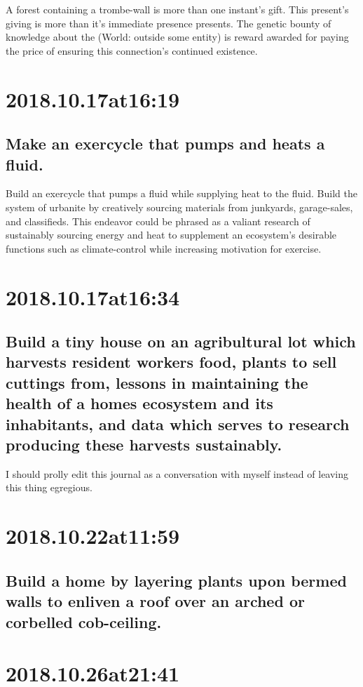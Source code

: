 A forest containing a trombe-wall is more than one instant's gift.
This present's giving is more than it's immediate presence presents.
The genetic bounty of knowledge about the (World: outside some entity) is reward awarded for paying the price of ensuring this connection's continued existence.

\section*{ 2018.10.17at16:19 }
\subsection*{ Make an exercycle that pumps and heats a fluid. }
Build an exercycle that pumps a fluid while supplying heat to the fluid. Build the system of urbanite by creatively sourcing materials from junkyards, garage-sales, and classifieds. This endeavor could be phrased as a valiant research of sustainably sourcing energy and heat to supplement an ecosystem's desirable functions such as climate-control while increasing motivation for exercise.

\section*{ 2018.10.17at16:34 }
\subsection*{ Build a tiny house on an agribultural lot which harvests resident workers food, plants to sell cuttings from, lessons in maintaining the health of a homes ecosystem and its inhabitants, and data which serves to research producing these harvests sustainably. }
I should prolly edit this journal as a conversation with myself instead of leaving this thing egregious.

\section*{ 2018.10.22at11:59 }
\subsection*{ Build a home by layering plants upon bermed walls to enliven a roof over an arched or corbelled cob-ceiling. }

\section*{ 2018.10.26at21:41 }
